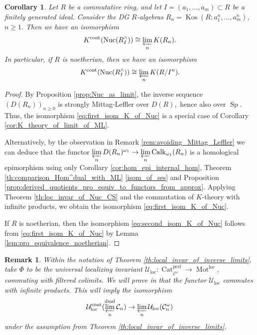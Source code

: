 \documentclass[11pt,leqno]{amsart}
\newtheorem{cor}[theo]{Corollary}
\newtheorem{remark}[theo]{Remark}
\numberwithin{equation}{section}
\newcommand{\prolim}[1][]{\mathop{\varprojlim}\limits_{#1}}
\newcommand{\Mot}{\operatorname{Mot}}
\newcommand{\Nuc}{\operatorname{Nuc}}
\newcommand{\Cat}{\operatorname{Cat}}
\newcommand{\loc}{\operatorname{loc}}
\newcommand{\cont}{\operatorname{cont}}
\newcommand{\dual}{\operatorname{dual}}
\newcommand{\cC}{{\mathcal C}}
\newcommand{\cE}{{\mathcal E}}
\newcommand{\cU}{{\mathcal U}}
\newcommand{\perf}{\operatorname{perf}}
\newcommand{\Kos}{\operatorname{Kos}}
\newcommand{\Sp}{\operatorname{Sp}}
\newcommand{\Calk}{\operatorname{Calk}}
\begin{document}
\begin{cor}\label{cor:K_theory_of_Nuc}
Let $R$ be a commutative ring, and let $I=(a_1,\dots,a_m)\subset R$ be a finitely generated ideal. Consider the DG $R$-algebras $R_n=\Kos(R;a_1^n,\dots,a_m^n),$ $n\geq 1.$ Then we have an isomorphism
\begin{equation}\label{eq:first_isom_K_of_Nuc}
K^{\cont}(\Nuc(R^{\wedge}_I))\cong \prolim[n] K(R_n).	
\end{equation}
In particular, if $R$ is noetherian, then we have an isomorphism
\begin{equation}\label{eq:second_isom_K_of_Nuc}
K^{\cont}(\Nuc(R^{\wedge}_I))\cong\prolim[n]K(R/I^n).
\end{equation}
\end{cor}

\begin{proof}
By Proposition \ref{prop:Nuc_as_limit}, the inverse sequence $(D(R_n))_{n\geq 0}$ is strongly Mittag-Leffler over $D(R),$ hence also over $\Sp.$ Thus, the isomorphism \eqref{eq:first_isom_K_of_Nuc} is a special case of Corollary \ref{cor:K_theory_of_limit_of_ML}.

Alternatively, by the observation in Remark \ref{rem:avoiding_Mittag_Leffler} we can deduce that the functor $\prolim[n]D(R_n)^{\omega_1}\to\prolim[n]\Calk_{\omega_1}(R_n)$ is a homological epimorphism using only Corollary \ref{cor:hom_epi_internal_hom}, Theorem \ref{th:comparison_Hom^dual_with_ML} \ref{isom_of_ses} and Proposition \ref{prop:derived_quotients_pro_equiv_to_functors_from_approx}. Applying Theorem \ref{th:loc_invar_of_Nuc_CS} and the commutation of $K$-theory with infinite products, we obtain the isomorphism \eqref{eq:first_isom_K_of_Nuc}.

If $R$ is noetherian, then the isomorphism \eqref{eq:second_isom_K_of_Nuc} follows from \eqref{eq:first_isom_K_of_Nuc} by Lemma \ref{lem:pro_equivalence_noetherian}. 
\end{proof}

\begin{remark}\label{rmk:U_loc_of_inverse_limits}
Within the notation of Theorem \ref{th:local_invar_of_inverse_limits}, take $\Phi$ to be the universal localizing invariant $\cU_{\loc}:\Cat_{\cE^{\omega}}^{\perf}\to\Mot^{\loc},$ commuting with filtered colimits. We will prove in \cite{E} that the functor $\cU_{\loc}$ commutes with infinite products. This will imply the isomorphism
\begin{equation*}
\cU_{\loc}^{\cont}(\prolim[n]^{\dual}\cC_n)\to \prolim[n]\cU_{\loc}(\cC_n^{\omega})
\end{equation*}
under the assumption from Theorem \ref{th:local_invar_of_inverse_limits}.
\end{remark}
\end{document}
